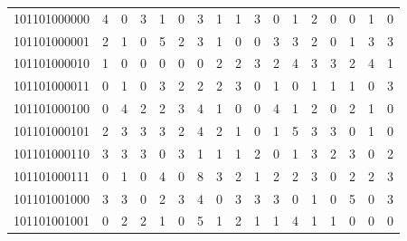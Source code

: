 \documentclass[10pt,a4paper]{article}
\begin{document}
\begin{longtable}{ |c|c|c|c|c|c|c|c|c|c|c|c|c|c|c|c|c| }
    101101000000              & 4                            & 0                                & 3                            & 1                              & 0   & 3   & 1   & 1   & 3   & 0   & 1   & 2   & 0   & 0   & 1   & 0   \\
    101101000001              & 2                            & 1                                & 0                            & 5                              & 2   & 3   & 1   & 0   & 0   & 3   & 3   & 2   & 0   & 1   & 3   & 3   \\
    101101000010              & 1                            & 0                                & 0                            & 0                              & 0   & 0   & 2   & 2   & 3   & 2   & 4   & 3   & 3   & 2   & 4   & 1   \\
    101101000011              & 0                            & 1                                & 0                            & 3                              & 2   & 2   & 2   & 3   & 0   & 1   & 0   & 1   & 1   & 1   & 0   & 3   \\
    101101000100              & 0                            & 4                                & 2                            & 2                              & 3   & 4   & 1   & 0   & 0   & 4   & 1   & 2   & 0   & 2   & 1   & 0   \\
    101101000101              & 2                            & 3                                & 3                            & 3                              & 2   & 4   & 2   & 1   & 0   & 1   & 5   & 3   & 3   & 0   & 1   & 0   \\
    101101000110              & 3                            & 3                                & 3                            & 0                              & 3   & 1   & 1   & 1   & 2   & 0   & 1   & 3   & 2   & 3   & 0   & 2   \\
    101101000111              & 0                            & 1                                & 0                            & 4                              & 0   & 8   & 3   & 2   & 1   & 2   & 2   & 3   & 0   & 2   & 2   & 3   \\
    101101001000              & 3                            & 3                                & 0                            & 2                              & 3   & 4   & 0   & 3   & 3   & 3   & 0   & 1   & 0   & 5   & 0   & 3   \\
    101101001001              & 0                            & 2                                & 2                            & 1                              & 0   & 5   & 1   & 2   & 1   & 1   & 4   & 1   & 1   & 0   & 0   & 0   \\

\end{longtable}
\end{document}

